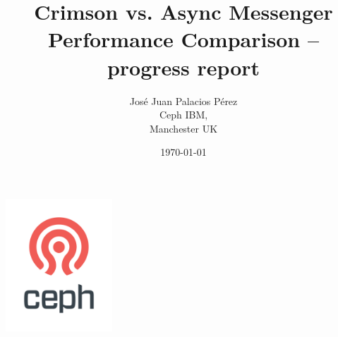 \title{\textbf{Crimson vs. Async Messenger Performance Comparison} -- progress report}
\author{Jos\'e Juan Palacios P\'erez\\Ceph IBM,\\Manchester UK}
\date{\today}

\begin{titlepage}
 \begin{minipage}{\textwidth}
   \begin{center}
      \includegraphics[width=0.3\textwidth]{ceph_362px.png}
      \maketitle
   \end{center}
   
   \vspace{0.5cm}
   \vfill
  \end{minipage}
\end{titlepage}
\tableofcontents
